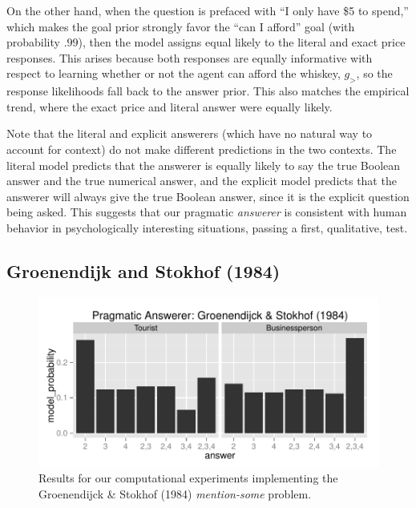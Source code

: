 \documentclass[12pt, floatsintext, jou]{apa6}
\begin{document}
On the other hand, when the question is prefaced with ``I only have \$5 to spend,'' which makes the goal prior strongly favor the ``can I afford'' goal (with probability $.99$), then the model assigns equal likely to the literal and exact price responses. This arises because both responses are equally informative with respect to learning whether or not the agent can afford the whiskey, $g_>$, so the response likelihoods fall back to the answer prior. This also matches the empirical trend, where the exact price and literal answer were equally likely.

Note that the literal and explicit answerers (which have no natural way to account for context) do not make different predictions in the two contexts. The literal model predicts that the answerer is equally likely to say the true Boolean answer and the true numerical answer, and the explicit model predicts that the answerer will always give the true Boolean answer, since it is the explicit question being asked. This suggests that our pragmatic \emph{answerer} is consistent with human behavior in psychologically interesting situations, passing a first, qualitative, test. 

\subsection{Groenendijk and Stokhof (1984)}
 \begin{figure}[t!]
\begin{center}
\includegraphics[scale = 1]{groenendijckPlot.pdf}
\end{center}
\vspace{-.25cm}
\caption{Results for our computational experiments implementing the Groenendijck \& Stokhof (1984) \emph{mention-some} problem.}
\label{fig:cafeExperimentResults}
\end{figure}
\end{document}
